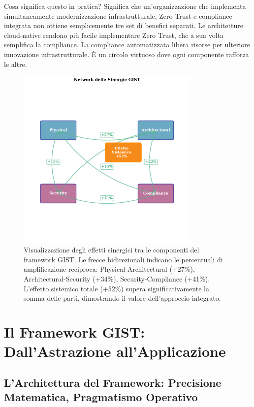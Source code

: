 Cosa significa questo in pratica? Significa che un'organizzazione che implementa simultaneamente modernizzazione infrastrutturale, Zero Trust e compliance integrata non ottiene semplicemente tre set di benefici separati. Le architetture cloud-native rendono più facile implementare Zero Trust, che a sua volta semplifica la compliance. La compliance automatizzata libera risorse per ulteriore innovazione infrastrutturale. È un circolo virtuoso dove ogni componente rafforza le altre.

\begin{figure}[htbp]
\centering
\includegraphics[width=0.8\textwidth]{thesis_figures/cap5/figura_5_2_synergies.pdf}
\caption{Visualizzazione degli effetti sinergici tra le componenti del framework GIST. Le frecce bidirezionali indicano le percentuali di amplificazione reciproca: Physical-Architectural (+27\%), Architectural-Security (+34\%), Security-Compliance (+41\%). L'effetto sistemico totale (+52\%) supera significativamente la somma delle parti, dimostrando il valore dell'approccio integrato.}
\label{fig:synergies}
\end{figure}

\section{Il Framework GIST: Dall'Astrazione all'Applicazione}

\subsection{L'Architettura del Framework: Precisione Matematica, Pragmatismo Operativo}

